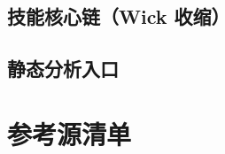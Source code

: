 \documentclass[UTF8]{ctexart}
\begin{document}


\subsection{技能核心链（Wick 收缩）}



\subsection{静态分析入口}



\section{参考源清单}
\end{document}
